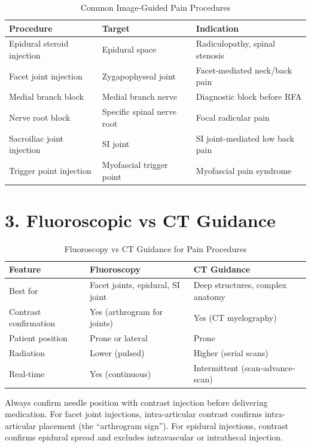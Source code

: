\begin{table}[h]
\centering
\begin{tabular}{@{}p{}p{}p{}@{}}
\hline
\textbf{Procedure} & \textbf{Target} & \textbf{Indication} \\
\hline
Epidural steroid injection & Epidural space & Radiculopathy, spinal stenosis \\
Facet joint injection & Zygapophyseal joint & Facet-mediated neck/back pain \\
Medial branch block & Medial branch nerve & Diagnostic block before RFA \\
Nerve root block & Specific spinal nerve root & Focal radicular pain \\
Sacroiliac joint injection & SI joint & SI joint-mediated low back pain \\
Trigger point injection & Myofascial trigger point & Myofascial pain syndrome \\
\hline
\end{tabular}
\caption{Common Image-Guided Pain Procedures}
\end{table}

\section{3. Fluoroscopic vs CT Guidance}

\begin{table}[h]
\centering
\begin{tabular}{@{}p{}p{}p{}@{}}
\hline
\textbf{Feature} & \textbf{Fluoroscopy} & \textbf{CT Guidance} \\
\hline
Best for & Facet joints, epidural, SI joint & Deep structures, complex anatomy \\
Contrast confirmation & Yes (arthrogram for joints) & Yes (CT myelography) \\
Patient position & Prone or lateral & Prone \\
Radiation & Lower (pulsed) & Higher (serial scans) \\
Real-time & Yes (continuous) & Intermittent (scan-advance-scan) \\
\hline
\end{tabular}
\caption{Fluoroscopy vs CT Guidance for Pain Procedures}
\end{table}

\begin{pearlbox}
Always confirm needle position with contrast injection before delivering medication. For facet joint injections, intra-articular contrast confirms intra-articular placement (the ``arthrogram sign''). For epidural injections, contrast confirms epidural spread and excludes intravascular or intrathecal injection.
\end{pearlbox}



